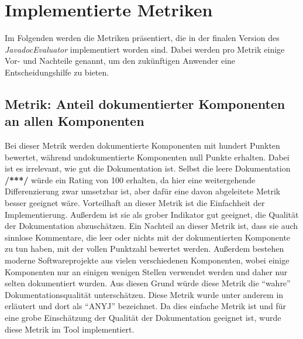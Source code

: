 \section{Implementierte Metriken}\label{chapter:metrics}
Im Folgenden werden die Metriken präsentiert, die in der finalen Version des \textit{JavadocEvaluator} implementiert worden sind. Dabei werden pro Metrik einige Vor- und Nachteile genannt, um den zukünftigen Anwender eine Entscheidungshilfe zu bieten. 
\subsection{Metrik: Anteil dokumentierter Komponenten an allen Komponenten}\label{chapter:metrics_simple_comment}
Bei dieser Metrik werden dokumentierte Komponenten mit hundert Punkten bewertet, während undokumentierte Komponenten null Punkte erhalten. Dabei ist es irrelevant, wie gut die Dokumentation ist. Selbst die leere Dokumentation \textbf{/***/} würde ein Rating von 100 erhalten, da hier eine weitergehende Differenzierung zwar umsetzbar ist, aber dafür eine davon abgeleitete Metrik besser geeignet wäre. Vorteilhaft an dieser Metrik ist die Einfachheit der Implementierung. Außerdem ist sie als grober Indikator gut geeignet, die Qualität der Dokumentation abzuschätzen. Ein Nachteil an dieser Metrik ist, dass sie auch sinnlose Kommentare, die leer oder nichts mit der dokumentierten Komponente zu tun haben, mit der vollen Punktzahl bewertet werden. Außerdem bestehen moderne Softwareprojekte aus vielen verschiedenen Komponenten, wobei einige Komponenten nur an einigen wenigen Stellen verwendet werden und daher nur selten dokumentiert wurden. Aus diesen Grund würde diese Metrik die \enquote{wahre} Dokumentationsqualität unterschätzen. 
Diese Metrik wurde unter anderem in \cite[S. 5]{HowDocumentationEvolvesoverTime} erläutert und dort als \enquote{ANYJ} bezeichnet. Da dies einfache Metrik ist und für eine grobe Einschätzung der Qualität der Dokumentation geeignet ist, wurde diese Metrik im Tool implementiert.

